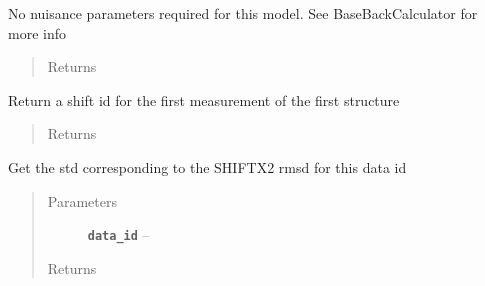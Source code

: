\documentclass[letterpaper,10pt,english]{sphinxmanual}
\begin{document}
\begin{fulllineitems}

\begin{fulllineitems}
\label{modules:backcalc.ShiftBackCalc.get_default_params}
No nuisance parameters required for this model. See BaseBackCalculator
for more info
\begin{quote}\begin{description}
\item[{Returns}] \leavevmode


\end{description}\end{quote}

\end{fulllineitems}


\begin{fulllineitems}
\label{modules:backcalc.ShiftBackCalc.get_default_struct_val}
Return a shift id for the first measurement of the first
structure
\begin{quote}\begin{description}
\item[{Returns}] \leavevmode


\end{description}\end{quote}

\end{fulllineitems}


\begin{fulllineitems}
\label{modules:backcalc.ShiftBackCalc.get_err_sig}
Get the std corresponding to the SHIFTX2 rmsd for this data id
\begin{quote}\begin{description}
\item[{Parameters}] \leavevmode
\textbf{\texttt{data\_id}} -- 

\item[{Returns}] \leavevmode


\end{description}\end{quote}

\end{fulllineitems}


\end{fulllineitems}
\end{document}
